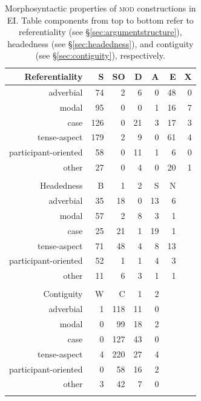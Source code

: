 \begin{table}
\centering
\begin{tabular}{rrrrrrr}
  \lsptoprule
Referentiality & S & SO & D & A & E & X \\ 
  \midrule
  adverbial &  74 &   2 &   6 &   0 &  48 &   0 \\ 
  modal &  95 &   0 &   0 &   1 &  16 &   7 \\ 
  case & 126 &   0 &  21 &   3 &  17 &   3 \\ 
  tense-aspect & 179 &   2 &   9 &   0 &  61 &   4 \\ 
  participant-oriented &  58 &   0 &  11 &   1 &   6 &   0 \\ 
  other &  27 &   0 &   4 &   0 &  20 &   1 \\ 
   \midrule
 \\
  \midrule
Headedness & B & 1 & 2 & S & N \\ 
  \midrule
  adverbial &  35 &  18 &   0 &  13 &   6 \\ 
  modal &  57 &   2 &   8 &   3 &   1 \\ 
  case &  25 &  21 &   1 &  19 &   1 \\ 
  tense-aspect &  71 &  48 &   4 &   8 &  13 \\ 
  participant-oriented &  52 &   1 &   1 &   4 &   3 \\ 
  other &  11 &   6 &   3 &   1 &   1 \\ 
   \midrule
 \\
  \midrule
Contiguity & W & C & 1 & 2 \\ 
  \midrule
  adverbial &   1 & 118 &  11 &   0 \\ 
  modal &   0 &  99 &  18 &   2 \\ 
  case &   0 & 127 &  43 &   0 \\ 
  tense-aspect &   4 & 220 &  27 &   4 \\ 
  participant-oriented &   0 &  58 &  16 &   2 \\ 
  other &   3 &  42 &   7 &   0 \\ 
   \lspbottomrule
\end{tabular}
\caption[Morphosyntactic properties of \textsc{mod} constructions]{Morphosyntactic properties of \textsc{mod} constructions in EI. Table components from top to bottom refer to referentiality (see §\ref{sec:argumentstructure}), headedness (see §\ref{sec:headedness}), and contiguity (see §\ref{sec:contiguity}), respectively.}
\label{table:mod_formal}
\end{table}


